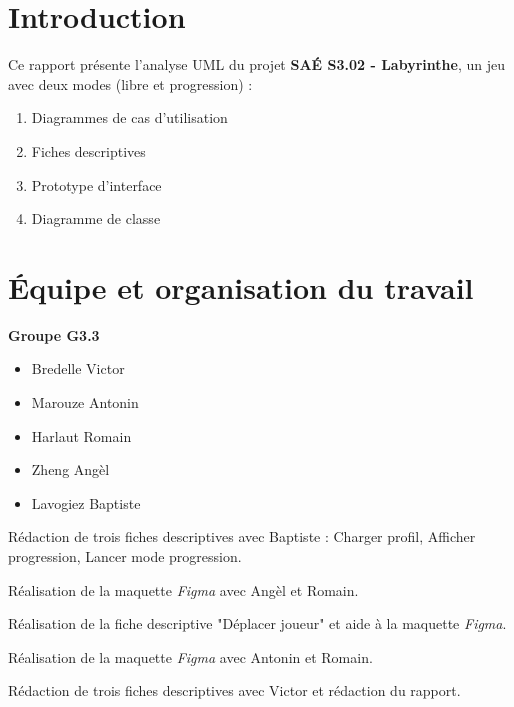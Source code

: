 \documentclass{butexFR}
\begin{document}
\fairepagedegarde
\fairemarges
\tabledematieres



\section{Introduction}

Ce rapport présente l'analyse UML du projet \textbf{SAÉ S3.02 - Labyrinthe}, un jeu avec deux modes (libre et progression) :

\begin{enumerate}
    \item Diagrammes de cas d'utilisation
    \item Fiches descriptives
    \item Prototype d'interface
    \item Diagramme de classe
\end{enumerate}

\section{Équipe et organisation du travail}
\textbf{Groupe G3.3}

\begin{itemize}
    \item Bredelle Victor
    \item Marouze Antonin
    \item Harlaut Romain
    \item Zheng Angèl
    \item Lavogiez Baptiste
\end{itemize}


Rédaction de trois fiches descriptives avec Baptiste : Charger profil, Afficher progression, Lancer mode progression.


Réalisation de la maquette \textit{Figma} avec Angèl et Romain.


Réalisation de la fiche descriptive "Déplacer joueur" et aide à la maquette \textit{Figma}.


Réalisation de la maquette \textit{Figma} avec Antonin et Romain.


Rédaction de trois fiches descriptives avec Victor et rédaction du rapport.
\end{document}
